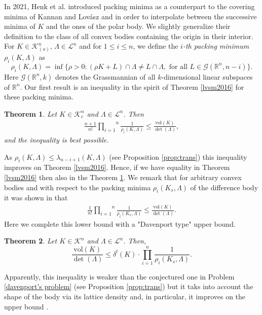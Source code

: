 \documentclass{amsart}
\newtheorem{theorem}{Theorem}[section]
\theoremstyle{definition}
\theoremstyle{remark}
\numberwithin{equation}{section}
\begin{document}
In 2021, Henk et al. \cite{hsx2021} introduced packing minima  as a counterpart to  the covering minima of Kannan and Lov{\'a}sz \cite{kl1988} and in order to interpolate between the successive minima of $K$ and the ones of the  polar body. We slightly generalize their definition to the class of all convex bodies containing the origin in their interior.  
For  $K\in\mathcal{K}^n_{(o)}$, $\Lambda\in\mathcal{L}^n$ and for $1\leq i\leq n$,  we define the {\it $i$-th packing minimum} $\rho_i(K,\Lambda)$  as
    $$\rho_i(K,\Lambda)=\inf\{\rho>0:(\rho K+L)\cap\Lambda\neq L\cap\Lambda,\text{ for all }L\in\mathcal{G}(\mathbb{R}^n,n-i)\}.$$
    Here $\mathcal{G}(\mathbb{R}^n,k)$ denotes the Grassmannian of all $k$-dimensional linear subspaces of $\mathbb{R}^n$. 
Our first result is an inequality in the spirit of Theorem \ref{lvsm2016} for these packing minima.
\begin{theorem}\label{thm:volume1}
Let $K\in\mathcal{K}_c^n$ and $\Lambda\in\mathcal{L}^n$. Then 
\begin{align}\label{vinequality1a}
    \frac{n+1}{n!}\overset{n}{\underset{i=1}{\prod}}\frac1{\rho_i(K,\Lambda)}\leq \frac{\mathrm{vol}(K)}{\det(\Lambda)},
\end{align}
and the inequality is best possible.
\end{theorem}
As $\rho_i(K,\Lambda)\leq \lambda_{n-i+1}(K,\Lambda)$ (see Proposition \ref{prop:trans}) this inequality improves on Theorem \ref{lvsm2016}. Hence, if we have equality in  Theorem \ref{lvsm2016} then also in the Theorem \ref{thm:volume1}. We remark that for arbitrary convex bodies and with respect to the packing minima $\rho_i(K_s,\Lambda)$ of the difference body it was shown in \cite[Theorem 1.2]{hsx2021} that 
\begin{align}\label{vinequality1b}
    \frac{1}{n!}\overset{n}{\underset{i=1}{\prod}}\frac1{\rho_i(K_s,\Lambda)}\leq \frac{\mathrm{vol}(K)}{\det(\Lambda)}. 
\end{align}
Here we complete this lower bound with a "Davenport type"  upper bound. 

\begin{theorem}\label{thm:volume2}
Let $K\in\mathcal{K}^n$ and $\Lambda\in\mathcal{L}^n$. Then,
$$\frac{\mathrm{vol}(K)}{\det(\Lambda)}\le\delta^l(K)\cdot\overset{n}{\underset{i=1}{\prod}}\frac1{\rho_i(K_s,\Lambda)}.$$ 
\end{theorem}

Apparently, this inequality is weaker than the conjectured one in Problem \ref{davenport's problem} (see Proposition \ref{prop:trans}) but it taks into account the shape of the body via its  lattice density and, in particular, it improves on the upper bound \cite[Theorem 1.2]{hsx2021}. 
\end{document}
